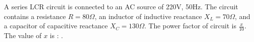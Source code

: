 \item A series LCR circuit is connected to an AC source of 220V, 50Hz. The circuit contains a resistance \( R = 80\Omega \), an inductor of inductive reactance \( X_L = 70\Omega \), and a capacitor of capacitive reactance \( X_C = 130\Omega \). The power factor of circuit is \( \frac{x}{10} \). The value of \( x \) is : \underline{\hspace{2.5cm}}.